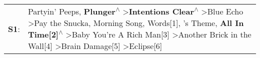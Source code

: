 \begin{supertabular}{p{0.03\textwidth}p{0.92\textwidth}}
 \textbf{S1}:  &  Partyin' Peeps\textsuperscript{}, \enspace \textbf{Plunger\textsuperscript{$\wedge$}} \textgreater \enspace \textbf{Intentions Clear\textsuperscript{$\wedge$}} \textgreater \enspace Blue Echo\textsuperscript{} \textgreater \enspace Pay the Snucka\textsuperscript{}, \enspace Morning Song\textsuperscript{}, \enspace Words[1]\textsuperscript{}, 's Theme\textsuperscript{}, \enspace \textbf{All In Time[2]\textsuperscript{$\wedge$}} \textgreater \enspace Baby You're A Rich Man[3]\textsuperscript{} \textgreater \enspace Another Brick in the Wall[4]\textsuperscript{} \textgreater \enspace Brain Damage[5]\textsuperscript{} \textgreater \enspace Eclipse[6]\textsuperscript{}  \enspace  \\
\end{supertabular}
